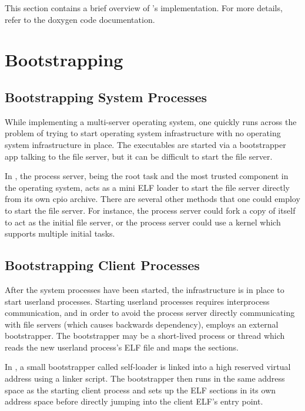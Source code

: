 %
%
%
%

This section contains a brief overview of 's implementation. For more details, refer to the doxygen code documentation.

\section{Bootstrapping}

\subsection*{Bootstrapping System Processes}
While implementing a multi-server operating system, one quickly runs across the problem of trying to start operating system infrastructure with no operating system infrastructure in place. The executables are started via a bootstrapper app talking to the file server, but it can be difficult to start the file server.

In , the process server, being the root task and the most trusted component in the operating system, acts as a mini ELF loader to start the file server directly from its own cpio archive. There are several other methods that one could employ to start the file server. For instance, the process server could fork a copy of itself to act as the initial file server, or the process server could use a kernel which supports multiple initial tasks.

\subsection*{Bootstrapping Client Processes}
After the system processes have been started, the infrastructure is in place to start userland processes. Starting userland processes requires interprocess communication, and in order to avoid the process server directly communicating with file servers (which causes backwards dependency),  employs an external bootstrapper. The bootstrapper may be a short-lived process or thread which reads the new userland process's ELF file and maps the sections.

In , a small bootstrapper called self-loader is linked into a high reserved virtual address using a linker script. The bootstrapper then runs in the same address space as the starting client process and sets up the ELF sections in its own address space before directly jumping into the client ELF's entry point.

